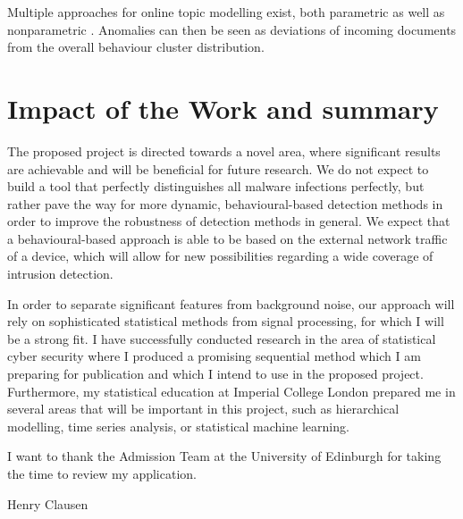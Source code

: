 \documentclass[11pt]{article}
\begin{document}
Multiple approaches for online topic modelling exist, both parametric \cite{NIPS2010_3902} as well as nonparametric \cite{wang2011online}. Anomalies can then be seen as deviations of incoming documents from the overall behaviour cluster distribution.

\section{Impact of the Work and summary}

The proposed project is directed towards a novel area, where significant results are achievable and will be beneficial for future research. We do not expect to build a tool that perfectly distinguishes all malware infections perfectly, but rather pave the way for more dynamic, behavioural-based detection methods in order to improve the robustness of detection methods in general. We expect that a behavioural-based approach is able to be based on the external network traffic of a device, which will allow for new possibilities regarding a wide coverage of intrusion detection. 

In order to separate significant features from background noise, our approach will rely on sophisticated statistical methods from signal processing, for which I will be a strong fit. I have successfully conducted research in the area of statistical cyber security where I produced a promising sequential method which I am preparing for publication and which I intend to use in the proposed project. Furthermore, my statistical education at Imperial College London prepared me in several areas that will be important in this project, such as hierarchical modelling, time series analysis, or statistical machine learning. 

\vspace{2cm}

\noindent I want to thank the Admission Team at the University of Edinburgh for taking the time to review my application.

\vspace{0.6cm}
\noindent Henry Clausen
\pagebreak



\end{document}
